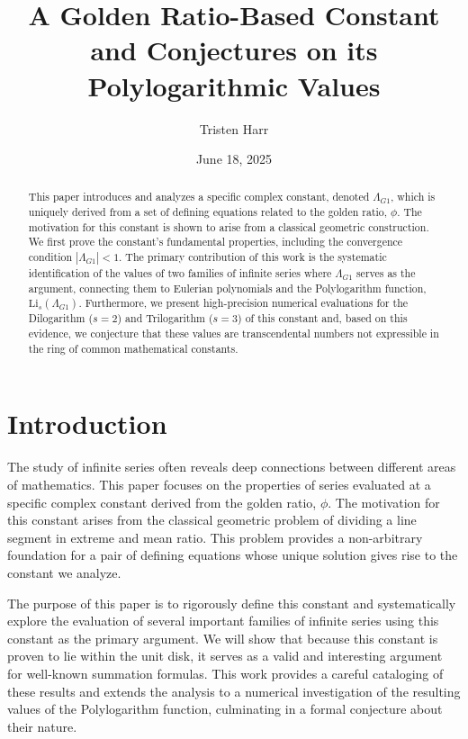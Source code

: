 \documentclass{amsart}
\theoremstyle{plain}
\theoremstyle{definition}
\theoremstyle{remark}
\newcommand{\LambdaG}{\Lambda_{G1}}
\begin{document}
\title[A Golden Ratio Constant and its Polylogarithmic Values]{A Golden Ratio-Based Constant and Conjectures on its Polylogarithmic Values}
\author{Tristen Harr}
\date{June 18, 2025}

\begin{abstract}
This paper introduces and analyzes a specific complex constant, denoted $\LambdaG$, which is uniquely derived from a set of defining equations related to the golden ratio, $\phi$. The motivation for this constant is shown to arise from a classical geometric construction. We first prove the constant's fundamental properties, including the convergence condition $|\LambdaG| < 1$. The primary contribution of this work is the systematic identification of the values of two families of infinite series where $\LambdaG$ serves as the argument, connecting them to Eulerian polynomials and the Polylogarithm function, $\mathrm{Li}_s(\LambdaG)$. Furthermore, we present high-precision numerical evaluations for the Dilogarithm ($s=2$) and Trilogarithm ($s=3$) of this constant and, based on this evidence, we conjecture that these values are transcendental numbers not expressible in the ring of common mathematical constants.
\end{abstract}

\maketitle

\section{Introduction}
The study of infinite series often reveals deep connections between different areas of mathematics. This paper focuses on the properties of series evaluated at a specific complex constant derived from the golden ratio, $\phi$. The motivation for this constant arises from the classical geometric problem of dividing a line segment in extreme and mean ratio. This problem provides a non-arbitrary foundation for a pair of defining equations whose unique solution gives rise to the constant we analyze.

The purpose of this paper is to rigorously define this constant and systematically explore the evaluation of several important families of infinite series using this constant as the primary argument. We will show that because this constant is proven to lie within the unit disk, it serves as a valid and interesting argument for well-known summation formulas. This work provides a careful cataloging of these results and extends the analysis to a numerical investigation of the resulting values of the Polylogarithm function, culminating in a formal conjecture about their nature.
\end{document}
